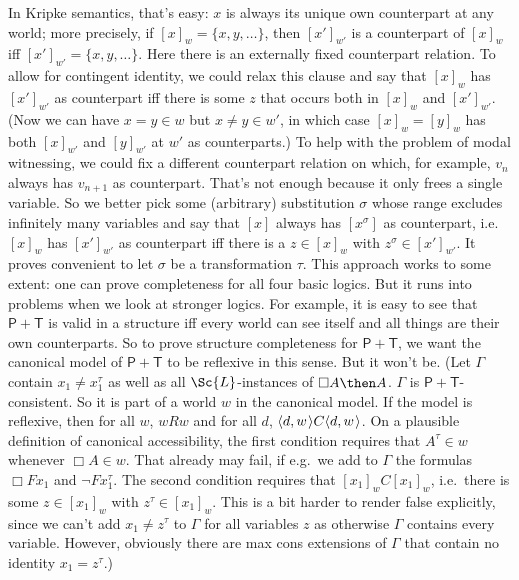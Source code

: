 \documentclass[11pt]{woarticle}
\theoremstyle{break}
\theoremstyle{nonumberplain}
\newcommand{\s}[1]{\ensuremath{\mathsf{#1}}}
\newcommand{\1}{\;\,|\;\,}
\renewcommand{\t}[1]{\ensuremath{\langle #1  \makebox[.2ex]{}\rangle}}
\begin{document}
{  In Kripke semantics, that's easy: $x$ is always its unique own counterpart at
  any world; more precisely, if $[x]_w = \{ x, y, \ldots\}$, then $[x']_{w'}$ is
  a counterpart of $[x]_w$ iff $[x']_{w'} = \{ x,y,\ldots\}$. Here there is an
  externally fixed counterpart relation. To allow for contingent identity, we
  could relax this clause and say that $[x]_w$ has $[x']_{w'}$ as counterpart
  iff there is some $z$ that occurs both in $[x]_w$ and $[x']_{w'}$. (Now we can
  have $x\!=\!y \in w$ but $x\!\not=\!y\in w'$, in which case $[x]_w=[y]_w$ has
  both $[x]_{w'}$ and $[y]_{w'}$ at $w'$ as counterparts.) To help with the
  problem of modal witnessing, we could fix a different counterpart relation on
  which, for example, $v_{n}$ always has $v_{n+1}$ as counterpart. That's not
  enough because it only frees a single variable. So we better pick some
  (arbitrary) substitution $\sigma$ whose range excludes infinitely many
  variables and say that $[x]$ always has $[x^\sigma]$ as counterpart, i.e.\
  $[x]_w$ has $[x']_{w'}$ as counterpart iff there is a $z\in [x]_w$ with
  $z^\sigma \in [x']_{w'}$. It proves convenient to let $\sigma$ be a
  transformation $\tau$. This approach works to some extent: one can prove
  completeness for all four basic logics. But it runs into problems when we look
  at stronger logics. For example, it is easy to see that $\s{P+T}$ is valid in
  a structure iff every world can see itself and all things are their own
  counterparts. So to prove structure completeness for $\s{P+T}$, we want the
  canonical model of $\s{P+T}$ to be reflexive in this sense. But it won't be.
  (Let $\Gamma$ contain $x_1 \not= x_1^\tau$ as well as all $\Sc{L}$-instances
  of $\Box A \then A$. $\Gamma$ is $\s{P+T}$-consistent. So it is part of a
  world $w$ in the canonical model. If the model is reflexive, then for all $w$,
  $wRw$ and for all $d$, $\t{d,w}C\t{d,w}$. On a plausible definition of
  canonical accessibility, the first condition requires that $A^\tau \in w$
  whenever $\Box A \in w$. That already may fail, if e.g.\ we add to $\Gamma$
  the formulas $\Box Fx_1$ and $\neg F x_1^\tau$. The second condition requires
  that $[x_1]_wC[x_1]_w$, i.e.\ there is some $z\in [x_1]_w$ with
  $z^\tau \in [x_1]_w$. This is a bit harder to render false explicitly, since
  we can't add $x_1\!\not=\!z^\tau$ to $\Gamma$ for all variables $z$ as
  otherwise $\Gamma$ contains every variable. However, obviously there are max
  cons extensions of $\Gamma$ that contain no identity $x_1\!=\!z^\tau$.)

}
\end{document}
